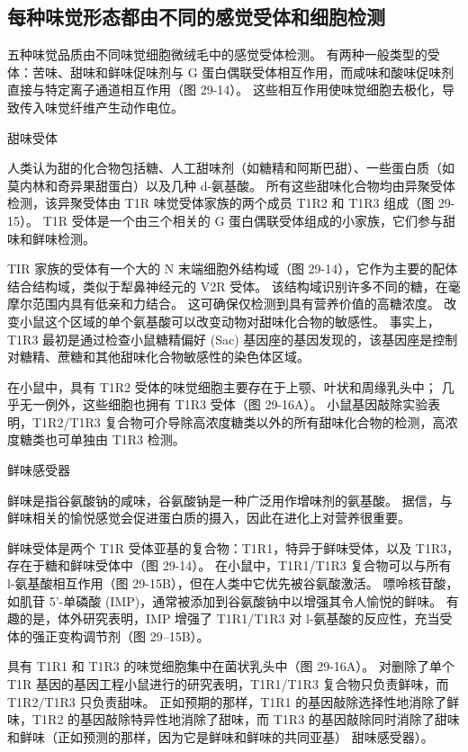 \subsection{每种味觉形态都由不同的感觉受体和细胞检测}
五种味觉品质由不同味觉细胞微绒毛中的感觉受体检测。 有两种一般类型的受体：苦味、甜味和鲜味促味剂与 G 蛋白偶联受体相互作用，而咸味和酸味促味剂直接与特定离子通道相互作用（图 29-14）。 这些相互作用使味觉细胞去极化，导致传入味觉纤维产生动作电位。

甜味受体

人类认为甜的化合物包括糖、人工甜味剂（如糖精和阿斯巴甜）、一些蛋白质（如莫内林和奇异果甜蛋白）以及几种 d-氨基酸。 所有这些甜味化合物均由异聚受体检测，该异聚受体由 T1R 味觉受体家族的两个成员 T1R2 和 T1R3 组成（图 29-15）。 T1R 受体是一个由三个相关的 G 蛋白偶联受体组成的小家族，它们参与甜味和鲜味检测。

TIR 家族的受体有一个大的 N 末端细胞外结构域（图 29-14），它作为主要的配体结合结构域，类似于犁鼻神经元的 V2R 受体。 该结构域识别许多不同的糖，在毫摩尔范围内具有低亲和力结合。 这可确保仅检测到具有营养价值的高糖浓度。 改变小鼠这个区域的单个氨基酸可以改变动物对甜味化合物的敏感性。 事实上，T1R3 最初是通过检查小鼠糖精偏好 (Sac) 基因座的基因发现的，该基因座是控制对糖精、蔗糖和其他甜味化合物敏感性的染色体区域。

在小鼠中，具有 T1R2 受体的味觉细胞主要存在于上颚、叶状和周缘乳头中； 几乎无一例外，这些细胞也拥有 T1R3 受体（图 29-16A）。 小鼠基因敲除实验表明，T1R2/T1R3 复合物可介导除高浓度糖类以外的所有甜味化合物的检测，高浓度糖类也可单独由 T1R3 检测。

鲜味感受器

鲜味是指谷氨酸钠的咸味，谷氨酸钠是一种广泛用作增味剂的氨基酸。 据信，与鲜味相关的愉悦感觉会促进蛋白质的摄入，因此在进化上对营养很重要。

鲜味受体是两个 T1R 受体亚基的复合物：T1R1，特异于鲜味受体，以及 T1R3，存在于糖和鲜味受体中（图 29-14）。 在小鼠中，T1R1/T1R3 复合物可以与所有 l-氨基酸相互作用（图 29-15B），但在人类中它优先被谷氨酸激活。 嘌呤核苷酸，如肌苷 5'-单磷酸 (IMP)，通常被添加到谷氨酸钠中以增强其令人愉悦的鲜味。 有趣的是，体外研究表明，IMP 增强了 T1R1/T1R3 对 l-氨基酸的反应性，充当受体的强正变构调节剂（图 29–15B）。

具有 T1R1 和 T1R3 的味觉细胞集中在菌状乳头中（图 29-16A）。 对删除了单个 T1R 基因的基因工程小鼠进行的研究表明，T1R1/T1R3 复合物只负责鲜味，而 T1R2/T1R3 只负责甜味。 正如预期的那样，T1R1 的基因敲除选择性地消除了鲜味，T1R2 的基因敲除特异性地消除了甜味，而 T1R3 的基因敲除同时消除了甜味和鲜味（正如预测的那样，因为它是鲜味和鲜味的共同亚基） 甜味感受器）。

